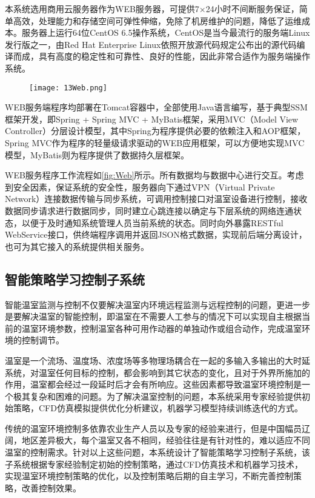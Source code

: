 本系统选用商用云服务器作为WEB服务器，可提供7×24小时不间断服务保证，简单高效，处理能力和存储空间可弹性伸缩，免除了机房维护的问题，降低了运维成本。服务器上运行64位CentOS 6.5操作系统，CentOS是当今最流行的服务端Linux发行版之一，由Red Hat Enterprise Linux依照开放源代码规定公布出的源代码编译而成，具有高度的稳定性和可靠性、良好的性能，因此非常合适作为服务端操作系统。
	  	\begin{figure}[!htp]
  			\centering
 			\texttt{[image: 13Web.png]}
		\end{figure}
WEB服务端程序均部署在Tomcat容器中，全部使用Java语言编写，基于典型SSM框架开发，即Spring + Spring MVC + MyBatis框架，采用MVC（Model View Controller）分层设计模型，其中Spring为程序提供必要的依赖注入和AOP框架，Spring MVC作为程序的轻量级请求驱动的WEB应用框架，可以方便地实现MVC模型，MyBatis则为程序提供了数据持久层框架。
 
WEB服务程序工作流程如\ref{fig:Web}所示。所有数据均与数据中心进行交互。考虑到安全因素，保证系统的安全性，服务器向下通过VPN（Virtual Private Network）连接数据传输与同步系统，可调用控制接口对温室设备进行控制，接收数据同步请求进行数据同步，同时建立心跳连接以确定与下层系统的网络连通状态，以便于及时通知系统管理人员当前系统的状态。同时向外暴露RESTful WebService接口，供终端程序调用并返回JSON格式数据，实现前后端分离设计，也可为其它接入的系统提供相关服务。

	\subsection{智能策略学习控制子系统}
智能温室监测与控制不仅要解决温室内环境远程监测与远程控制的问题，更进一步是要解决温室的智能控制，即温室在不需要人工参与的情况下可以实现自主根据当前的温室环境参数，控制温室各种可用作动器的单独动作或组合动作，完成温室环境的控制调节。

温室是一个流场、温度场、浓度场等多物理场耦合在一起的多输入多输出的大时延系统，对温室任何目标的控制，都会影响到其它状态的变化，且对于外界所施加的作用，温室都会经过一段延时后才会有所响应。这些因素都导致温室环境控制是一个极其复杂和困难的问题。为了解决温室控制的问题，本系统采用专家经验提供初始策略，CFD仿真模拟提供优化分析建议，机器学习模型持续训练迭代的方式。

传统的温室环境控制多依靠农业生产人员以及专家的经验来进行，但是中国幅员辽阔，地区差异极大，每个温室又各不相同，经验往往是有针对性的，难以适应不同温室的控制需求。针对以上这些问题，本系统设计了智能策略学习控制子系统，该子系统根据专家经验制定初始的控制策略，通过CFD仿真技术和机器学习技术，实现温室环境控制策略的优化，以及控制策略后期的自主学习，不断完善控制策略，改善控制效果。

